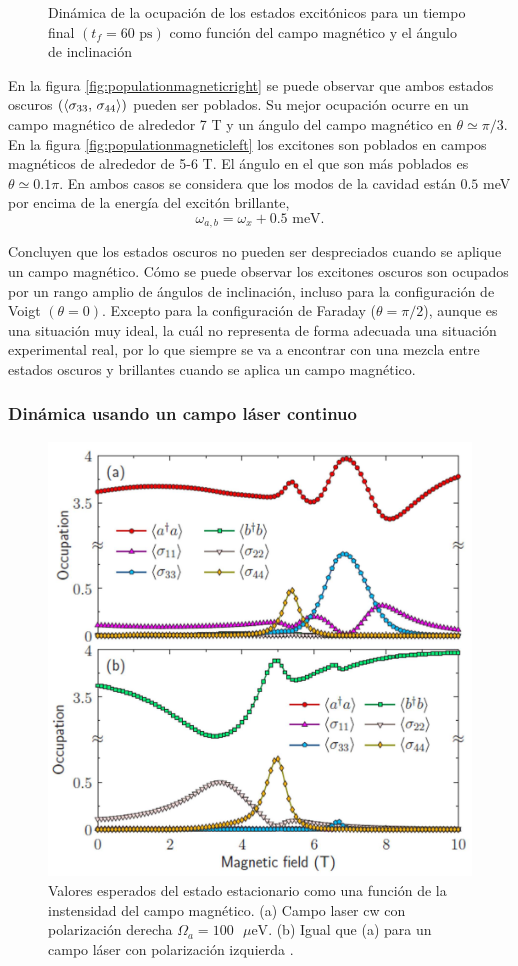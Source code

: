 \documentclass[main.tex]{subfiles}
\begin{document}
\begin{figure}
	\caption{Dinámica de la ocupación de los estados excitónicos para un tiempo final $(t_f=60\text{ ps})$ como función del campo magnético y el ángulo de inclinación \parencite{Jimenez2017}}
	\label{fig:populationMagnetic}
\end{figure}

En la figura \ref{fig:populationmagneticright} se puede observar que ambos estados oscuros $(\braket{\sigma_{33},\, \sigma_{44}})$ pueden ser poblados. Su mejor ocupación ocurre en un campo magnético de alrededor 7 T y un ángulo del campo magnético en $\theta \simeq \pi/3$. En la figura \ref{fig:populationmagneticleft} los excitones son poblados en campos magnéticos de alrededor de 5-6 T. El ángulo en el que son más poblados es $\theta \simeq 0.1\pi$. En ambos casos se considera que los modos de la cavidad están $0.5$ meV por encima de la energía del excitón brillante,
\begin{equation}
	\omega_{a,b} = \omega_x + 0.5\text{ meV}.
\end{equation}

Concluyen que los estados oscuros no pueden ser despreciados cuando se aplique un campo magnético. Cómo se puede observar los excitones oscuros son ocupados por un rango amplio de ángulos de inclinación, incluso para la configuración de Voigt $(\theta=0)$. Excepto para la configuración de Faraday ($\theta=\pi/2$), aunque es una situación muy ideal, la cuál no representa de forma adecuada una situación experimental real, por lo que siempre se va a encontrar con una mezcla entre estados oscuros y brillantes cuando se aplica un campo magnético.

\subsubsection{Dinámica usando un campo láser continuo}

\begin{figure}[th]
	\centering
	\includegraphics[width=0.7\linewidth]{img/PopulationMagnetic-cwLaser}
	\caption{Valores esperados del estado estacionario como una función de la instensidad del campo magnético. (a) Campo laser cw con polarización derecha $\Omega_a = 100\text{ $\mu$eV}$. (b) Igual que (a) para un campo láser con polarización izquierda \parencite{Jimenez2017}.}
	\label{fig:populationmagnetic-cwlaser}
\end{figure}
\end{document}
